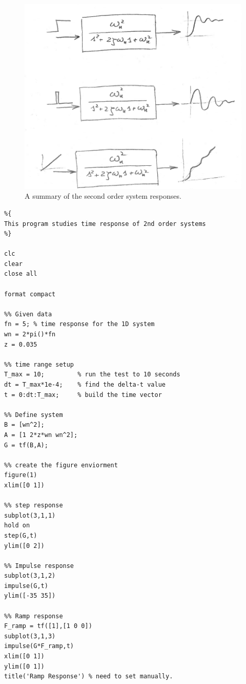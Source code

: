 \documentclass[12pt,letter]{article}
\numberwithin{ex}{section} %
\numberwithin{re}{section} %
\numberwithin{equation}{section}	%
\begin{document}
\begin{figure}[H]
	\centering
	\includegraphics[width=4.5in]{../figures/Summary_of_second_order_system_response}
	\caption{A summary of the second order system responses.}
\end{figure}

\lstset{linewidth=5.8in}
\begin{minipage}{1\textwidth}
	\begin{center}
		\begin{lstlisting}
%{
This program studies time response of 2nd order systems
%}

clc
clear
close all

format compact

%% Given data
fn = 5; % time response for the 1D system
wn = 2*pi()*fn
z = 0.035

%% time range setup
T_max = 10;         % run the test to 10 seconds
dt = T_max*1e-4;    % find the delta-t value 
t = 0:dt:T_max;     % build the time vector

%% Define system
B = [wn^2];
A = [1 2*z*wn wn^2];
G = tf(B,A); 

%% create the figure enviorment
figure(1)
xlim([0 1])

%% step response 
subplot(3,1,1)
hold on
step(G,t)
ylim([0 2])

%% Impulse response
subplot(3,1,2)
impulse(G,t)
ylim([-35 35])

%% Ramp response
F_ramp = tf([1],[1 0 0])
subplot(3,1,3)
impulse(G*F_ramp,t)
xlim([0 1])
ylim([0 1])
title('Ramp Response') % need to set manually. 
		\end{lstlisting}
	\end{center}
\end{minipage}
\end{document}
